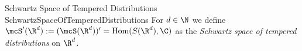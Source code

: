 \begin{mdef}{Schwartz Space of Tempered Distributions \cite[2.13]{skript:foandenk}}{SchwartzSpaceOfTemperedDistributions}
    For $d\in\N$ we define $\mcS'(\R^d):=(\mcS(\R^d))' = \text{Hom}(S(\R^d),\C)$ as the \emph{Schwartz space of tempered distributions} on $\R^d$.
\end{mdef}
